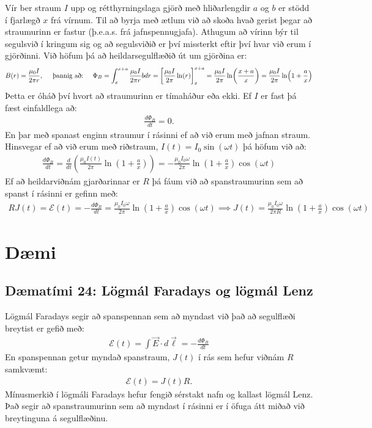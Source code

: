 Vír ber straum $I$ upp og rétthyrningslaga gjörð með hliðarlengdir $a$ og $b$ er stödd í fjarlægð $x$ frá vírnum. Til að byrja með ætlum við að skoða hvað gerist þegar að straumurinn er fastur (þ.e.a.s. frá jafnspennugjafa). Athugum að vírinn býr til segulsvið í kringum sig og að segulsviðið er því missterkt eftir því hvar við erum í gjörðinni. Við höfum þá að heildarsegulflæðið út um gjörðina er:
\begin{align*}
    B(r) = \frac{\mu_0 I}{2\pi r}, \hspace{0.5cm} \text{þannig að:} \hspace{0.5cm}
    \Phi_B = \int_{x}^{x+a} \frac{\mu_0 I}{2\pi r} b dr = \left[ \frac{\mu_0 I}{2\pi} \ln(r) \right]_{x}^{x+a} = \frac{\mu_0 I}{2\pi} \ln(\frac{x+a}{x}) = \frac{\mu_0 I}{2\pi} \ln(1 + \frac{a}{x})
\end{align*}
Þetta er óháð því hvort að straumurinn er tímaháður eða ekki. Ef $I$ er fast þá fæst einfaldlega að:
\begin{align*}
    \frac{d\Phi_B}{dt} = 0.
\end{align*}
En þar með spanast enginn straumur í rásinni ef að við erum með jafnan straum. Hinsvegar ef að við erum með riðstraum, $I(t) = I_0 \sin(\omega t)$ þá höfum við að:
\begin{align*}
    \frac{d \Phi_B}{dt} = \frac{d}{dt}\left( \frac{\mu_0 I(t)}{2\pi} \ln(1 + \frac{a}{x}) \right) = -\frac{\mu_0 I_0 \omega}{2 \pi} \ln(1 + \frac{a}{x}) \cos(\omega t)
\end{align*}
Ef að heildarviðnám gjarðarinnar er $R$ þá fáum við að spanstraumurinn sem að spanst í rásinni er gefinn með:
\begin{align*}
    R J(t) = \mathcal{E}(t) = -\frac{d\Phi_B}{dt} = \frac{\mu_0 I_0 \omega}{2 \pi} \ln(1 + \frac{a}{x}) \cos(\omega t) \implies J(t) = \frac{\mu_0 I_0 \omega}{2 \pi R} \ln(1 + \frac{a}{x}) \cos(\omega t)
\end{align*}


\newpage

\section{Dæmi}

\subsection*{Dæmatími 24: Lögmál Faradays og lögmál Lenz}

\begin{tcolorbox}
Lögmál Faradays segir að spanspennan sem að myndast við það að segulflæði breytist er gefið með:
\begin{align*}
     \mathcal{E}(t) = \int \vec{E} \cdot d\vec{\ell} = -\frac{d \Phi_B}{dt}
\end{align*}
 En spanspennan getur myndað spanstraum, $J(t)$ í rás sem hefur viðnám $R$ samkvæmt:
\begin{align*}
     \mathcal{E}(t) = J(t) R.
\end{align*}
Mínusmerkið í lögmáli Faradays hefur fengið sérstakt nafn og kallast lögmál Lenz. Það segir að spanstraumurinn sem að myndast í rásinni er í öfuga átt miðað við breytinguna á segulflæðinu.
\end{tcolorbox}

